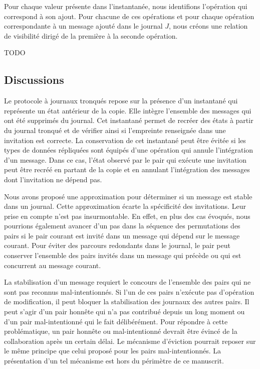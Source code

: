 Pour chaque valeur présente dans l'instantanée, nous identifions l'opération qui correspond à son ajout.
Pour chacune de ces opérations et pour chaque opération correspondante à un message ajouté dans le journal $J$, nous créons une relation de visibilité dirigé de la première à la seconde opération.

TODO


\subsection{Discussions}

Le protocole à journaux tronqués repose sur la présence d'un instantané qui représente un état antérieur de la copie.
Elle intègre l'ensemble des messages qui ont été supprimés du journal.
Cet instantané permet de recréer des états à partir du journal tronqué et de vérifier ainsi si l'empreinte renseignée dans une invitation est correcte.
La conservation de cet instantané peut être évitée si les types de données répliquées sont équipés d'une opération qui annule l'intégration d'un message.
Dans ce cas, l'état observé par le pair qui exécute une invitation peut être recréé en partant de la copie et en annulant l'intégration des messages dont l'invitation ne dépend pas.

Nous avons proposé une approximation pour déterminer si un message est stable dans un journal.
Cette approximation écarte la spécificité des invitations.
Leur prise en compte n'est pas insurmontable.
En effet, en plus des cas évoqués, nous pourrions également avancer d'un pas dans la séquence des permutations des pairs si le pair courant est invité dans un message qui dépend sur le message courant.
Pour éviter des parcours redondants dans le journal, le pair peut conserver l'ensemble des pairs invités dans un message qui précède ou qui est concurrent au message courant.

La stabilisation d'un message requiert le concours de l'ensemble des pairs qui ne sont pas reconnus mal-intentionnés.
Si l'un de ces pairs n'exécute pas d'opération de modification, il peut bloquer la stabilisation des journaux des autres pairs.
Il peut s'agir d'un pair honnête qui n'a pas contribué depuis un long moment ou d'un pair mal-intentionné qui le fait délibérément.
Pour répondre à cette problématique, un pair honnête ou mal-intentionné devrait être évincé de la collaboration après un certain délai.
Le mécanisme d'éviction pourrait reposer sur le même principe que celui proposé pour les pairs mal-intentionnés.
La présentation d'un tel mécanisme est hors du périmètre de ce manuscrit.



